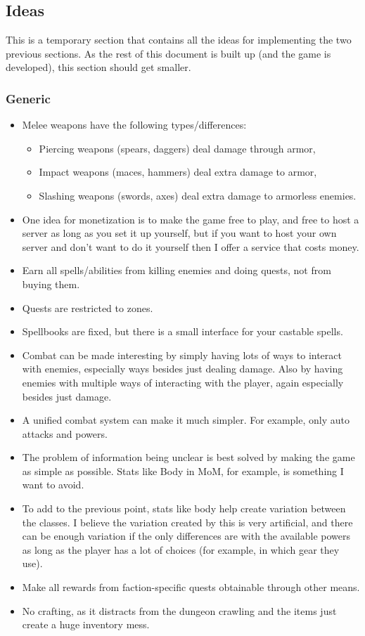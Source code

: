 \documentclass{article}
\begin{document}
\subsection{Ideas}
This is a temporary section that contains all the ideas for implementing the two previous sections.
As the rest of this document is built up (and the game is developed), this section should get smaller.
\subsubsection{Generic}
\begin{itemize}
    \item  Melee weapons have the following types/differences:
        \begin{itemize}
            \item Piercing weapons (spears, daggers) deal damage through armor,
            \item Impact weapons (maces, hammers) deal extra damage to armor,
            \item Slashing weapons (swords, axes) deal extra damage to armorless enemies.
        \end{itemize}
    \item One idea for monetization is to make the game free to play, and free to host a server as long as
        you set it up yourself, but if you want to host your own server and don't want to do it yourself
        then I offer a service that costs money.
    \item Earn all spells/abilities from killing enemies and doing quests, not from buying them.
    \item Quests are restricted to zones.
    \item Spellbooks are fixed, but there is a small interface for your castable spells.
    \item Combat can be made interesting by simply having lots of ways
        to interact with enemies, especially ways besides just dealing damage. Also by having
        enemies with multiple ways of interacting with the player, again especially besides just damage.
    \item A unified combat system can make it much simpler. For example, only auto attacks and powers.
    \item The problem of information being unclear is best solved by making the
        game as simple as possible. Stats like Body in MoM, for example, is something I want to avoid.
    \item To add to the previous point, stats like body help create variation between the classes. I
        believe the variation created by this is very artificial, and there can be enough variation if
        the only differences are with the available powers as long as the player has a lot of choices
        (for example, in which gear they use).
    \item Make all rewards from faction-specific quests obtainable through other means.
    \item No crafting, as it distracts from the dungeon crawling and the items just create a huge inventory mess.
\end{itemize}
\end{document}
